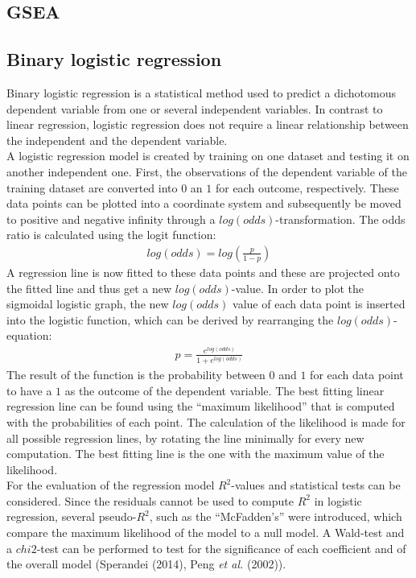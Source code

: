 \documentclass[
  parskip,
  oneside]{scrreprt}
\begin{document}
\hypertarget{gsea}{%
\subsection{GSEA}\label{gsea}}

\hypertarget{binary-logistic-regression}{%
\subsection{Binary logistic
regression}\label{binary-logistic-regression}}

Binary logistic regression is a statistical method used to predict a
dichotomous dependent variable from one or several independent
variables. In contrast to linear regression, logistic regression does
not require a linear relationship between the independent and the
dependent variable.\\
A logistic regression model is created by training on one dataset and
testing it on another independent one. First, the observations of the
dependent variable of the training dataset are converted into \(0\) an
\(1\) for each outcome, respectively. These data points can be plotted
into a coordinate system and subsequently be moved to positive and
negative infinity through a \(log(odds)\)-transformation. The odds ratio
is calculated using the logit function: \begin{gather*}
log(odds)=log(\frac{p}{1-p})
\end{gather*} A regression line is now fitted to these data points and
these are projected onto the fitted line and thus get a new
\(log(odds)\)-value. In order to plot the sigmoidal logistic graph, the
new \(log(odds)\) value of each data point is inserted into the logistic
function, which can be derived by rearranging the
\(log(odds)\)-equation: \begin{gather*}
p=\frac{e^{log(odds)}}{1+e^{log(odds)}}
\end{gather*} The result of the function is the probability between
\(0\) and \(1\) for each data point to have a \(1\) as the outcome of
the dependent variable. The best fitting linear regression line can be
found using the ``maximum likelihood'' that is computed with the
probabilities of each point. The calculation of the likelihood is made
for all possible regression lines, by rotating the line minimally for
every new computation. The best fitting line is the one with the maximum
value of the likelihood.\\
For the evaluation of the regression model \(R^2\)-values and
statistical tests can be considered. Since the residuals cannot be used
to compute \(R^2\) in logistic regression, several pseudo-\(R^2\), such
as the ``McFadden's'' were introduced, which compare the maximum
likelihood of the model to a null model. A Wald-test and a \(chi2\)-test
can be performed to test for the significance of each coefficient and of
the overall model (Sperandei (2014), Peng \emph{et al.} (2002)).
\end{document}
